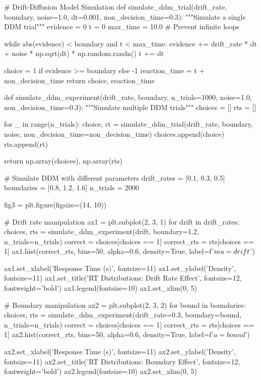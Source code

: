 \documentclass[a4paper, 11pt]{article}
\begin{document}
\begin{pycode}
# Drift-Diffusion Model Simulation
def simulate_ddm_trial(drift_rate, boundary, noise=1.0, dt=0.001, non_decision_time=0.3):
    """Simulate a single DDM trial"""
    evidence = 0
    t = 0
    max_time = 10.0  # Prevent infinite loops

    while abs(evidence) < boundary and t < max_time:
        evidence += drift_rate * dt + noise * np.sqrt(dt) * np.random.randn()
        t += dt

    choice = 1 if evidence >= boundary else -1
    reaction_time = t + non_decision_time
    return choice, reaction_time

def simulate_ddm_experiment(drift_rate, boundary, n_trials=1000, noise=1.0, non_decision_time=0.3):
    """Simulate multiple DDM trials"""
    choices = []
    rts = []

    for _ in range(n_trials):
        choice, rt = simulate_ddm_trial(drift_rate, boundary, noise, non_decision_time=non_decision_time)
        choices.append(choice)
        rts.append(rt)

    return np.array(choices), np.array(rts)

# Simulate DDM with different parameters
drift_rates = [0.1, 0.3, 0.5]
boundaries = [0.8, 1.2, 1.6]
n_trials = 2000

fig3 = plt.figure(figsize=(14, 10))

# Drift rate manipulation
ax1 = plt.subplot(2, 3, 1)
for drift in drift_rates:
    choices, rts = simulate_ddm_experiment(drift, boundary=1.2, n_trials=n_trials)
    correct = choices[choices == 1]
    correct_rts = rts[choices == 1]
    ax1.hist(correct_rts, bins=50, alpha=0.6, density=True, label=f'$\\mu={drift}$')

ax1.set_xlabel('Response Time (s)', fontsize=11)
ax1.set_ylabel('Density', fontsize=11)
ax1.set_title('RT Distributions: Drift Rate Effect', fontsize=12, fontweight='bold')
ax1.legend(fontsize=10)
ax1.set_xlim(0, 5)

# Boundary manipulation
ax2 = plt.subplot(2, 3, 2)
for bound in boundaries:
    choices, rts = simulate_ddm_experiment(drift_rate=0.3, boundary=bound, n_trials=n_trials)
    correct = choices[choices == 1]
    correct_rts = rts[choices == 1]
    ax2.hist(correct_rts, bins=50, alpha=0.6, density=True, label=f'$a={bound}$')

ax2.set_xlabel('Response Time (s)', fontsize=11)
ax2.set_ylabel('Density', fontsize=11)
ax2.set_title('RT Distributions: Boundary Effect', fontsize=12, fontweight='bold')
ax2.legend(fontsize=10)
ax2.set_xlim(0, 5)


\end{pycode}
\end{document}
